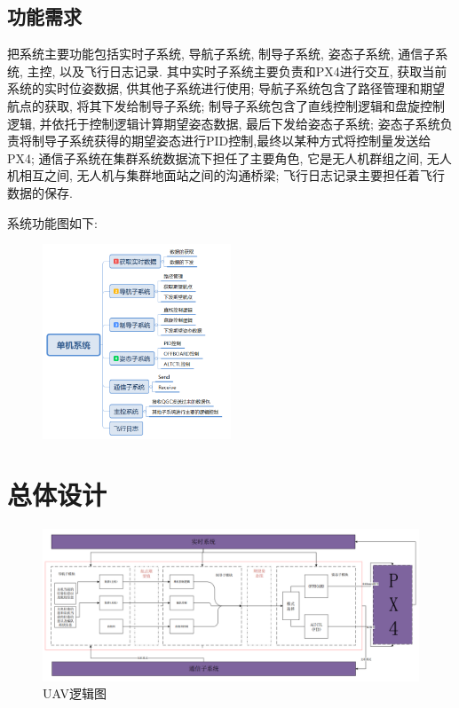         \subsection{功能需求}
            把系统主要功能包括实时子系统, 导航子系统, 制导子系统, 姿态子系统, 通信子系统, 主控, 以及飞行日志记录. 
            其中实时子系统主要负责和PX4进行交互, 获取当前系统的实时位姿数据, 供其他子系统进行使用; 
            导航子系统包含了路径管理和期望航点的获取, 将其下发给制导子系统; 
            制导子系统包含了直线控制逻辑和盘旋控制逻辑, 并依托于控制逻辑计算期望姿态数据, 最后下发给姿态子系统; 
            姿态子系统负责将制导子系统获得的期望姿态进行PID控制,最终以某种方式将控制量发送给PX4;
            通信子系统在集群系统数据流下担任了主要角色, 它是无人机群组之间, 无人机相互之间, 无人机与集群地面站之间的沟通桥梁; 
            飞行日志记录主要担任着飞行数据的保存. 
            \par
            系统功能图如下: 
            \begin{figure}[htbp]
              \centering
              \includegraphics[width=0.5\textwidth]{pictures/single_system.png}
              \label{single_system}
            \end{figure}
    \clearpage
    \section{总体设计}
      \begin{figure}[h]
        \centering
        \includegraphics[width=\textwidth]{pictures/modules.png}
        \caption{UAV逻辑图}
        \label{fig:UAV}
      \end{figure}
